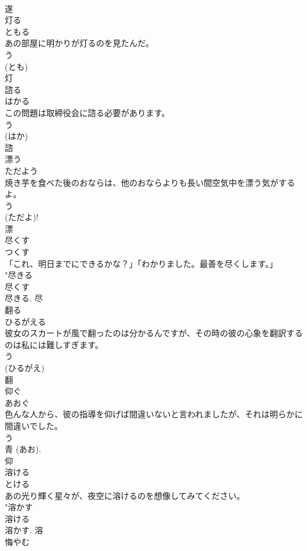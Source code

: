 \documentclass[8pt]{extreport}
\begin{document}
\begin{CJK}{UTF8}{min}
\\	遂	
\\	灯る	
\\	ともる	
\\	あの部屋に明かりが灯るのを見たんだ。	
\\	う 
\\	(とも) 
\\	灯	
\\	諮る	
\\	はかる	
\\	この問題は取締役会に諮る必要があります。	
\\	う 
\\	(はか) 
\\	諮	
\\	漂う	
\\	ただよう	
\\	焼き芋を食べた後のおならは、他のおならよりも長い間空気中を漂う気がするよ。	
\\	う 
\\	(ただよ)! 
\\	漂	
\\	尽くす	
\\	つくす	
\\	「これ、明日までにできるかな？」「わかりました。最善を尽くします。」	
\\	"尽きる 
\\	尽くす 
\\	尽きる.	尽	
\\	翻る	
\\	ひるがえる	
\\	彼女のスカートが風で翻ったのは分かるんですが、その時の彼の心象を翻訳するのは私には難しすぎます。	
\\	う 
\\	(ひるがえ) 
\\	翻	
\\	仰ぐ	
\\	あおぐ	
\\	色んな人から、彼の指導を仰げば間違いないと言われましたが、それは明らかに間違いでした。	
\\	う 
\\	青 (あお). 
\\	仰	
\\	溶ける	
\\	とける	
\\	あの光り輝く星々が、夜空に溶けるのを想像してみてください。	
\\	"溶かす 
\\	溶ける 
\\	溶かす.	溶	
\\	悔やむ	

\end{CJK}
\end{document}
